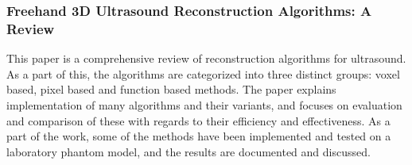 \subsubsection{Freehand 3D Ultrasound Reconstruction Algorithms: A Review \cite{solberg2007}}

	This paper is a comprehensive review of reconstruction algorithms for ultrasound. As a part of this, the algorithms are categorized into three distinct groups: voxel based, pixel based and function based methods. The paper explains implementation of many algorithms and their variants, and focuses on evaluation and comparison of these with regards to their efficiency and effectiveness. As a part of the work, some of the methods have been implemented and tested on a laboratory phantom model, and the results are documented and discussed.